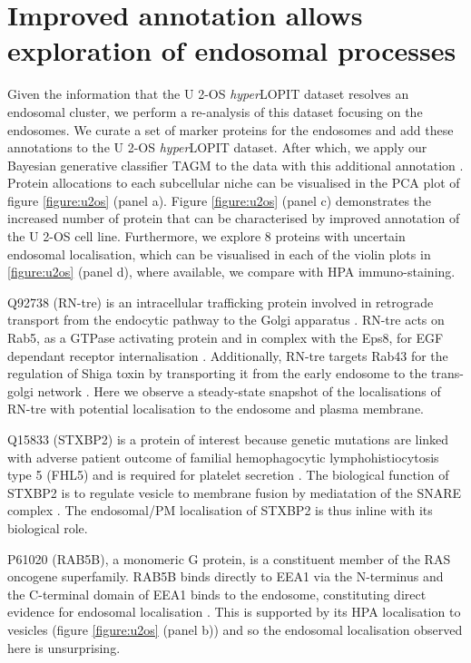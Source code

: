 \documentclass[12pt,english]{article}
\begin{document}
\section{Improved annotation allows exploration of endosomal processes}
Given the information that the U 2-OS \textit{hyper}LOPIT dataset resolves an endosomal cluster, we perform a re-analysis of this dataset focusing on the endosomes. We curate a set of marker proteins for the endosomes and add these annotations to the U 2-OS \textit{hyper}LOPIT dataset. After which, we apply our Bayesian generative classifier TAGM to the data with this additional annotation \citep{Crook:2018}. Protein allocations to each subcellular niche can be visualised in the PCA plot of figure \ref{figure:u2os} (panel a). Figure \ref{figure:u2os} (panel c) demonstrates the increased number of protein that can be characterised by improved annotation of the U 2-OS cell line. Furthermore, we explore $8$ proteins with uncertain endosomal localisation, which can be visualised in each of the violin plots in \ref{figure:u2os} (panel d), where available, we compare with HPA immuno-staining.

Q92738 (RN-tre) is an intracellular trafficking protein involved in retrograde transport from the endocytic pathway to the Golgi apparatus \citep{Haas:2007}. RN-tre acts on Rab5, as a GTPase activating protein and in complex with the Eps8, for EGF dependant receptor internalisation \citep{Lanzetti:2000}. Additionally, RN-tre targets Rab43 for the regulation of Shiga toxin by transporting it from the early endosome to the trans-golgi network \citep{Fuchs:2007}. Here we observe a steady-state snapshot of the localisations of RN-tre with potential localisation to the endosome and plasma membrane.

Q15833 (STXBP2) is a protein of interest because genetic mutations are linked with adverse patient outcome of familial hemophagocytic lymphohistiocytosis type 5 (FHL5) \citep{Zur:2009, Pagel:2012} and is required for platelet secretion \citep{Al:2012}. The biological function of STXBP2 is to regulate vesicle to membrane fusion by mediatation of the SNARE complex \citep{Martin:2003, Sigismund:2012}. The endosomal/PM localisation of STXBP2 is thus inline with its biological role. 

P61020 (RAB5B), a monomeric G protein, is a constituent member of the RAS oncogene superfamily. RAB5B binds directly to EEA1 via the N-terminus and the C-terminal domain of EEA1 binds to the endosome, constituting direct evidence for endosomal localisation \citep{Callaghan:1999}. This is supported by its HPA localisation to vesicles (figure \ref{figure:u2os} (panel b)) and so the endosomal localisation observed here is unsurprising. 
\end{document}
